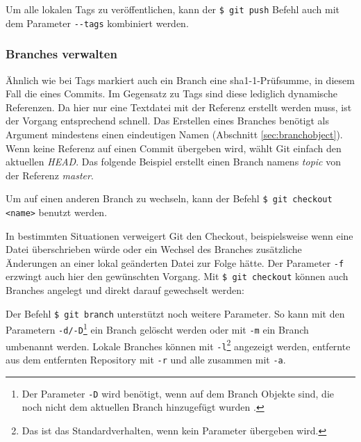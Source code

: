 
Um alle lokalen Tags zu veröffentlichen, kann der \texttt{\$ git push} Befehl auch mit
dem Parameter \texttt{-{}-{}tags} kombiniert werden. \cite[70-71,162-163]{gitosp}


\subsubsection{Branches verwalten}
Ähnlich wie bei Tags markiert auch ein Branch eine \acrshort{sha1}-1-Prüfsumme, in
diesem Fall die eines Commits. Im Gegensatz zu Tags sind diese lediglich
dynamische Referenzen. Da hier nur eine Textdatei mit der Referenz erstellt
werden muss, ist der Vorgang entsprechend schnell. Das Erstellen eines
Branches benötigt als Argument mindestens einen eindeutigen Namen (Abschnitt
\ref{sec:branchobject}). Wenn keine Referenz auf einen Commit übergeben wird,
wählt Git einfach den aktuellen \textit{\gls{HEAD}}. Das folgende Beispiel
erstellt einen Branch namens \textit{topic} von der Referenz \textit{master}.


Um auf einen anderen Branch zu wechseln, kann der Befehl \texttt{\$ git checkout
<name>} benutzt werden.

In bestimmten Situationen verweigert Git den Checkout, beispielsweise wenn eine
Datei überschrieben würde oder ein Wechsel des Branches zusätzliche Änderungen
an einer lokal geänderten Datei zur Folge hätte. Der Parameter \texttt{-f}
erzwingt auch hier den gewünschten Vorgang. Mit \texttt{\$ git checkout} können
auch Branches angelegt und direkt darauf gewechselt werden:


Der Befehl \texttt{\$ git branch} unterstützt noch weitere Parameter. So kann
mit den Parametern \texttt{-d/-D}\footnote{Der Parameter \texttt{-D} wird
benötigt, wenn auf dem Branch Objekte sind, die noch nicht dem aktuellen Branch
hinzugefügt wurden \cite[67]{gitosp}.} ein Branch gelöscht werden oder mit
\texttt{-m} ein Branch umbenannt werden. Lokale Branches können mit
\texttt{-l}\footnote{Das ist das Standardverhalten, wenn kein Parameter
übergeben wird.} angezeigt werden, entfernte aus dem entfernten Repository mit
\texttt{-r} und alle zusammen mit \texttt{-a}. \cite[65-67]{gitosp}

